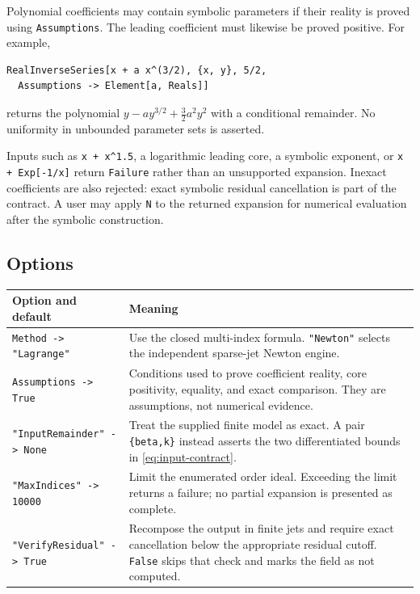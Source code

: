 \documentclass[11pt,a4paper]{article}
\numberwithin{equation}{section}
\theoremstyle{definition}
\newcommand{\code}[1]{\texttt{#1}}
\begin{document}
Polynomial coefficients may contain symbolic parameters if their reality
is proved using \code{Assumptions}. The leading coefficient must likewise
be proved positive. For example,
\begin{lstlisting}
RealInverseSeries[x + a x^(3/2), {x, y}, 5/2,
  Assumptions -> Element[a, Reals]]
\end{lstlisting}
returns the polynomial $y-a y^{3/2}+\tfrac32a^2y^2$ with a conditional
remainder. No uniformity in unbounded parameter sets is asserted.

Inputs such as \code{x + x\^{}1.5}, a logarithmic leading core, a symbolic
exponent, or \code{x + Exp[-1/x]} return \code{Failure} rather than an
unsupported expansion. Inexact coefficients are also rejected: exact
symbolic residual cancellation is part of the contract. A user may apply
\code{N} to the returned expansion for numerical evaluation after the
symbolic construction.

\subsection{Options}
\begingroup\small
\begin{longtable}{@{}>{\raggedright\arraybackslash}p{}>{\raggedright\arraybackslash}p{}@{}}
\toprule
Option and default & Meaning\\\midrule\endhead
\code{Method -> "Lagrange"} & Use the closed multi-index formula.
\code{"Newton"} selects the independent sparse-jet Newton engine.\\[4pt]
\code{Assumptions -> True} & Conditions used to prove coefficient reality,
core positivity, equality, and exact comparison. They are assumptions,
not numerical evidence.\\[4pt]
\code{"InputRemainder" -> None} & Treat the supplied finite model as exact.
A pair \code{\{beta,k\}} instead asserts the two differentiated bounds
in \eqref{eq:input-contract}.\\[4pt]
\code{"MaxIndices" -> 10000} & Limit the enumerated order ideal. Exceeding
the limit returns a failure; no partial expansion is presented as complete.\\[4pt]
\code{"VerifyResidual" -> True} & Recompose the output in finite jets and
require exact cancellation below the appropriate residual cutoff.
\code{False} skips that check and marks the field as not computed.\\
\bottomrule
\end{longtable}
\endgroup
\end{document}
